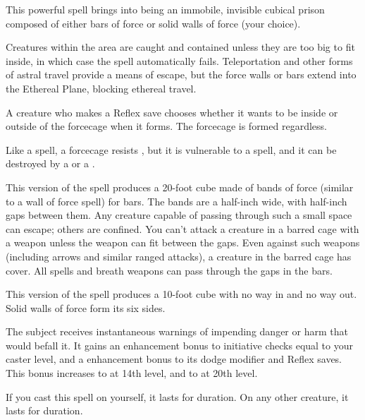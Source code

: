 \spellrng{\rngmed}
\begin{spelleffect}
  This powerful spell brings into being an immobile, invisible cubical prison composed of either bars of force or solid walls of force (your choice).
  \par Creatures within the area are caught and contained unless they are too big to fit inside, in which case the spell automatically fails. Teleportation and other forms of astral travel provide a means of escape, but the force walls or bars extend into the Ethereal Plane, blocking ethereal travel.
  \par A creature who makes a Reflex save chooses whether it wants to be inside or outside of the forcecage when it forms. The forcecage is formed regardless.
  \par Like a  spell, a forcecage resists , but it is vulnerable to a  spell, and it can be destroyed by a  or a .
  \par {} This version of the spell produces a 20-foot cube made of bands of force (similar to a wall of force spell) for bars. The bands are a half-inch wide, with half-inch gaps between them. Any creature capable of passing through such a small space can escape; others are confined. You can't attack a creature in a barred cage with a weapon unless the weapon can fit between the gaps. Even against such weapons (including arrows and similar ranged attacks), a creature in the barred cage has cover. All spells and breath weapons can pass through the gaps in the bars.
  \par {} This version of the spell produces a 10-foot cube with no way in and no way out. Solid walls of force form its six sides.
\end{spelleffect}

\begin{spelleffect} 
    The subject receives instantaneous warnings of impending danger or harm that would befall it. It gains an enhancement bonus to initiative checks equal to your caster level, and a  enhancement bonus to its dodge modifier and Reflex saves. This bonus increases to  at 14th level, and to  at 20th level.
  \par If you cast this spell on yourself, it lasts for \durlong duration. On any other creature, it lasts for \durshort duration.
\end{spelleffect}

